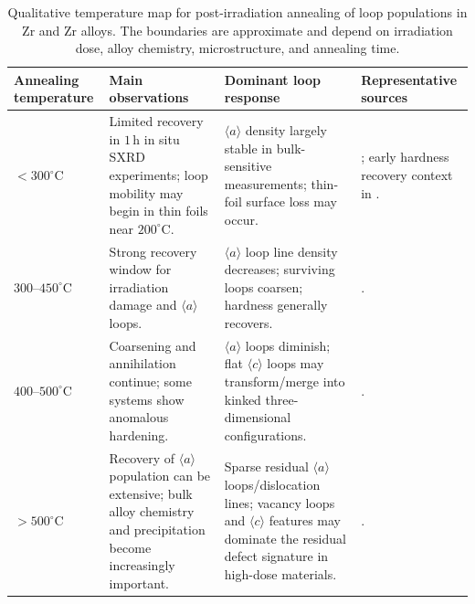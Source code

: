 \documentclass[11pt]{article}
\newcommand{\degreeC}{^\circ\mathrm{C}}
\begin{document}
\begin{table}[htbp]
\centering
\caption{Qualitative temperature map for post-irradiation annealing of loop populations in Zr and Zr alloys.  The boundaries are approximate and depend on irradiation dose, alloy chemistry, microstructure, and annealing time.}
\label{tab:temperature-map}
\begin{tabularx}{\textwidth}{p{}YYY}
\toprule
Annealing temperature & Main observations & Dominant loop response & Representative sources \\
\midrule
$<300\degreeC$ & Limited recovery in $1\,\mathrm{h}$ in situ SXRD experiments; loop mobility may begin in thin foils near $200\degreeC$. & $\langle a\rangle$ density largely stable in bulk-sensitive measurements; thin-foil surface loss may occur. & \citet{Topping2018}; early hardness recovery context in \citet{HoweThomas1974}. \\
$300$--$450\degreeC$ & Strong recovery window for irradiation damage and $\langle a\rangle$ loops. & $\langle a\rangle$ loop line density decreases; surviving loops coarsen; hardness generally recovers. & \citet{Ribis2008,Ribis2010,Topping2018,Francis2015}. \\
$400$--$500\degreeC$ & Coarsening and annihilation continue; some systems show anomalous hardening. & $\langle a\rangle$ loops diminish; flat $\langle c\rangle$ loops may transform/merge into kinked three-dimensional configurations. & \citet{Liu2025}. \\
$>500\degreeC$ & Recovery of $\langle a\rangle$ population can be extensive; bulk alloy chemistry and precipitation become increasingly important. & Sparse residual $\langle a\rangle$ loops/dislocation lines; vacancy loops and $\langle c\rangle$ features may dominate the residual defect signature in high-dose materials. & \citet{Ribis2008,Ribis2010,Liu2025,Adamson2019}. \\
\bottomrule
\end{tabularx}
\end{table}
\end{document}
